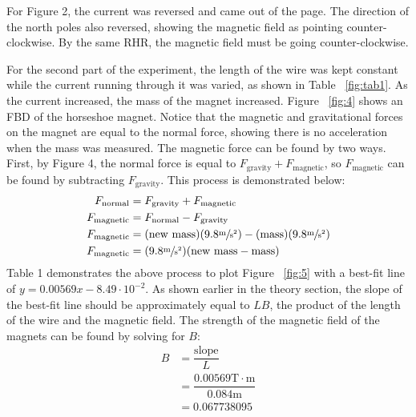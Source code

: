 \documentclass [12pt, letterpaper, twoside]{article}
\begin{document}
\noindent
For Figure 2, the current was reversed and came out of the page. The direction of the north poles also reversed, showing the magnetic field as pointing counter-clockwise. By the same RHR, the magnetic field must be going counter-clockwise.

\noindent
For the second part of the experiment, the length of the wire was kept constant while the current running through it was varied, as shown in Table ~\ref{fig:tab1}. As the current increased, the mass of the magnet increased. Figure ~\ref{fig:4} shows an FBD of the horseshoe magnet. Notice that the magnetic and gravitational forces on the magnet are equal to the normal force, showing there is no acceleration when the mass was measured. The magnetic force can be found by two ways. First, by Figure 4, the normal force is equal to \(F_{\text{gravity}} + F_{\text{magnetic}}\), so \(F_{\text{magnetic}}\) can be found by subtracting \(F_{\text{gravity}}\). This process is demonstrated below:
\begin{equation*}
  \begin{split}
    F_{\text{normal}} &= F_{\text{gravity}} + F_{\text{magnetic}} \\
    F_{\text{magnetic}} &= F_{\text{normal}} - F_{\text{gravity}} \\
    F_{\text{magnetic}} &= (\text{new mass})(9.8 \sfrac{\text{m}}{\text{s}^{2}}) - (\text{mass})(9.8 \sfrac{\text{m}}{\text{s}^{2}}) \\
    F_{\text{magnetic}} &= (9.8\sfrac{\text{m}}{\text{s}^{2}})(\text{new mass} - \text{mass}) \\
  \end{split}
\end{equation*}
Table 1 demonstrates the above process to plot Figure ~\ref{fig:5} with a best-fit line of \(y = 0.00569x - 8.49\cdot{10}^{-2}\). As shown earlier in the theory section, the slope of the best-fit line should be approximately equal to \(LB\), the product of the length of the wire and the magnetic field. The strength of the magnetic field of the magnets can be found by solving for \(B\):
\begin{equation*}
  \begin{split}
    B &= \dfrac{\text{slope}}{L} \\
      &= \dfrac{0.00569\text{T}\cdot\text{m}}{0.084\text{m}} \\
      &= 0.067738095 \\
  \end{split}
\end{equation*}
\end{document}
